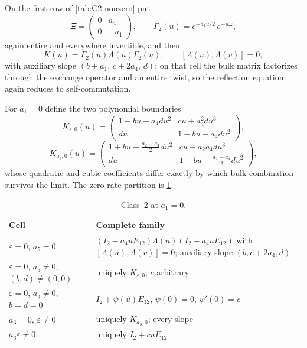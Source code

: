 \documentclass[11pt,reqno]{amsart}
\theoremstyle{plain}
\theoremstyle{definition}
\theoremstyle{remark}
\numberwithin{equation}{section}
\newcommand{\Id}{I_2}
\begin{document}
On the first row of \cref{tab:C2-nonzero} put
\begin{equation}
\Xi=\begin{pmatrix}0&a_4\\0&-a_1\end{pmatrix},\qquad
\Gamma_2(u)=e^{-a_1u/2}\,e^{-u\Xi},
\label{eq:C2-twist}
\end{equation}
again entire and everywhere invertible, and then
\begin{equation}
K(u)=\Gamma_2(u)\Lambda(u)\Gamma_2(u),\qquad [\Lambda(u),\Lambda(v)]=0,
\label{eq:C2-factor}
\end{equation}
with auxiliary slope $(b+a_1,\,c+2a_4,\,d)$: on that cell the bulk matrix
factorizes through the exchange operator and an entire twist, so the reflection
equation again reduces to self-commutation.

For $a_1=0$ define the two polynomial boundaries
\begin{equation}
K_{\varepsilon,0}(u)=\begin{pmatrix}
1+bu-a_4du^2&cu+a_4^2du^3\\du&1-bu-a_4du^2
\end{pmatrix},                                      \label{eq:C2-delta0}
\end{equation}
\begin{equation}
K_{a_3,0}(u)=\begin{pmatrix}
1+bu+\frac{a_2-a_4}{2}du^2&cu-a_2a_4du^3\\
du&1-bu+\frac{a_2-a_4}{2}du^2
\end{pmatrix},                                      \label{eq:C2-a30}
\end{equation}
whose quadratic and cubic coefficients differ exactly by which bulk combination
survives the limit. The zero-rate partition is \cref{tab:C2-zero}.

\begin{table}[t]
\centering\small
\caption{Class~2 at $a_1=0$.}
\label{tab:C2-zero}
\begin{tabularx}{\textwidth}{>{\RaggedRight\arraybackslash}X >{\RaggedRight\arraybackslash}X}
\toprule
Cell & Complete family \\
\midrule
$\varepsilon=0$, $a_5=0$ &
$(\Id-a_4uE_{12})\Lambda(u)(\Id-a_4uE_{12})$ with $[\Lambda(u),\Lambda(v)]=0$; auxiliary slope $(b,c+2a_4,d)$ \\
$\varepsilon=0$, $a_5\ne0$, $(b,d)\ne(0,0)$ & uniquely $K_{\varepsilon,0}$; $c$ arbitrary \\
$\varepsilon=0$, $a_5\ne0$, $b=d=0$ & $\Id+\psi(u)E_{12}$, $\psi(0)=0$, $\psi'(0)=c$ \\
$a_3=0$, $\varepsilon\ne0$ & uniquely $K_{a_3,0}$; every slope \\
$a_3\varepsilon\ne0$ & uniquely $\Id+cuE_{12}$ \\
\bottomrule
\end{tabularx}
\end{table}
\end{document}
